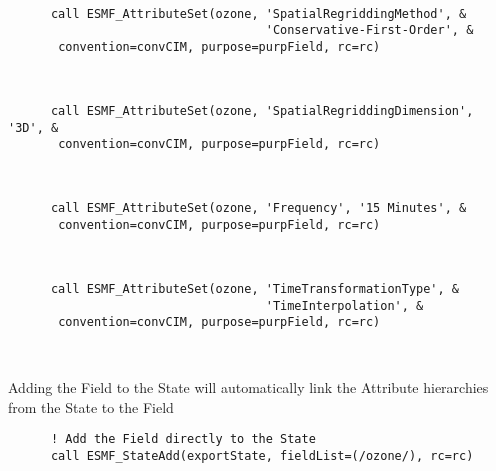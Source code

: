 
 \begin{verbatim}

      call ESMF_AttributeSet(ozone, 'SpatialRegriddingMethod', &
                                    'Conservative-First-Order', &
       convention=convCIM, purpose=purpField, rc=rc)
 
\end{verbatim}
 

 \begin{verbatim}

      call ESMF_AttributeSet(ozone, 'SpatialRegriddingDimension', '3D', &
       convention=convCIM, purpose=purpField, rc=rc)
 
\end{verbatim}
 

 \begin{verbatim}

      call ESMF_AttributeSet(ozone, 'Frequency', '15 Minutes', &
       convention=convCIM, purpose=purpField, rc=rc)
 
\end{verbatim}
 

 \begin{verbatim}

      call ESMF_AttributeSet(ozone, 'TimeTransformationType', &
                                    'TimeInterpolation', &
       convention=convCIM, purpose=purpField, rc=rc)

 
\end{verbatim}
 

  \begin{sloppypar}
       Adding the Field to the State will automatically link the
       Attribute hierarchies from the State to the Field
  \end{sloppypar} 

 \begin{verbatim}
      ! Add the Field directly to the State
      call ESMF_StateAdd(exportState, fieldList=(/ozone/), rc=rc)

 
\end{verbatim}
 
